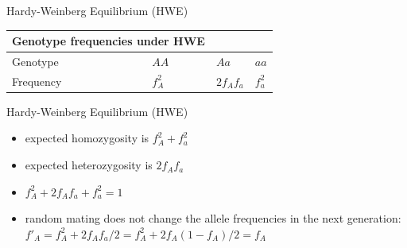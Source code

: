 \begin{frame}{Hardy-Weinberg Equilibrium (HWE)}

	\begin{table}[h]
                \centering
                \begin{tabular}{p{} p{} p{} p{}}
                        \toprule
                        \multicolumn{2}{p{0.5\textwidth}}{Genotype frequencies under HWE} \\
                        \midrule
			Genotype & $AA$ & $Aa$ & $aa$ \\
			Frequency & $f_A^2$ & $2f_Af_a$ & $f_a^2$\\
                        \bottomrule
                \end{tabular}
        \end{table}

\end{frame}


\begin{frame}{Hardy-Weinberg Equilibrium (HWE)}

	\small
	\begin{itemize}
		\item expected homozygosity is $f_A^2 + f_a^2$
		\item expected heterozygosity is $2f_Af_a$
		\pause
		\item $f_A^2 + 2f_Af_a + f_a^2 = 1$
		\pause
		\item random mating does not change the allele frequencies in the next generation: \\
		$f'_A = f_A^2 + 2f_Af_a/2 = f_A^2 + 2f_A(1-f_A)/2=f_A$
	\end{itemize}

\end{frame}


